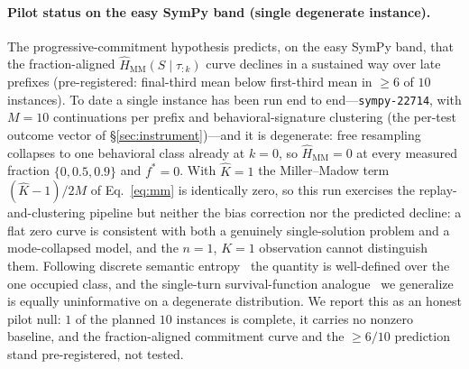 \documentclass[11pt]{article}
\newcommand{\strat}{S}
\begin{document}
\paragraph{Pilot status on the easy SymPy band (single degenerate instance).}
The progressive-commitment hypothesis predicts, on the easy SymPy band, that the
fraction-aligned $\widehat H_{\mathrm{MM}}(\strat\mid\tau_{:k})$ curve declines in a
sustained way over late prefixes (pre-registered: final-third mean below first-third
mean in $\geq\!6$ of $10$ instances). To date a single instance has been run end to
end---\texttt{sympy-22714}, with $M\!=\!10$ continuations per prefix and
behavioral-signature clustering (the per-test outcome vector of
\S\ref{sec:instrument})---and it is degenerate: free resampling collapses to one
behavioral class already at $k\!=\!0$, so $\widehat H_{\mathrm{MM}}=0$ at every
measured fraction $\{0,0.5,0.9\}$ and $f^\ast=0$. With $\hat K\!=\!1$ the
Miller--Madow term $(\hat K-1)/2M$ of Eq.~\eqref{eq:mm} is identically zero, so this
run exercises the replay-and-clustering pipeline but neither the bias correction nor
the predicted decline: a flat zero curve is consistent with both a genuinely
single-solution problem and a mode-collapsed model, and the $n\!=\!1$, $K\!=\!1$
observation cannot distinguish them. Following discrete semantic
entropy~\citep{farquhar2024semantic,kuhn2023semantic} the quantity is well-defined
over the one occupied class, and the single-turn survival-function
analogue~\citep{bigelow2024forking} we generalize is equally uninformative on a
degenerate distribution. We report this as an honest pilot null: $1$ of the planned
$10$ instances is complete, it carries no nonzero baseline, and the fraction-aligned
commitment curve and the $\geq\!6/10$ prediction stand pre-registered, not tested.
\end{document}
